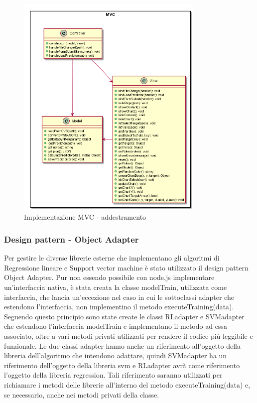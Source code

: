 \documentclass[../manuale-sviluppatore.tex]{subfiles}
\begin{document}
\begin{figure}[H]
    \begin{center}
         \includegraphics[width=9cm]{img/mvcTA.png}
         \caption{Implementazione MVC - addestramento}
         \label{fig:MVC}
     \end{center}
 \end{figure}

\subsubsection{Design pattern - Object Adapter}
\label{ssec:design_pattern_object_adapter}
Per gestire le diverse librerie esterne che implementano gli algoritmi di Regressione lineare e Support vector machine è stato utilizzato il design pattern Object Adapter.
Pur non essendo possibile con node.js implementare un'interfaccia nativa, è stata creata la classe modelTrain, utilizzata come interfaccia, che lancia un'eccezione nel caso
in cui le sottoclassi adapter che estendono l'interfaccia, non implementino il metodo executeTraining(data).
Seguendo questo principio sono state create le classi RLadapter e SVMadapter che estendono l'interfaccia modelTrain e implementano il metodo ad essa associato, oltre a vari metodi privati
utilizzati per rendere il codice più leggibile e funzionale.
Le due classi adapter hanno anche un riferimento all'oggetto della libreria dell'algoritmo che intendono adattare, quindi SVMadapter ha un riferimento dell'oggetto della libreria svm e
RLadapter avrà come riferimento l'oggetto della libreria regression. Tali riferimento saranno utilizzati per richiamare i metodi delle librerie all'interno del metodo executeTraining(data)
e, se necessario, anche nei metodi privati della classe.
\end{document}
